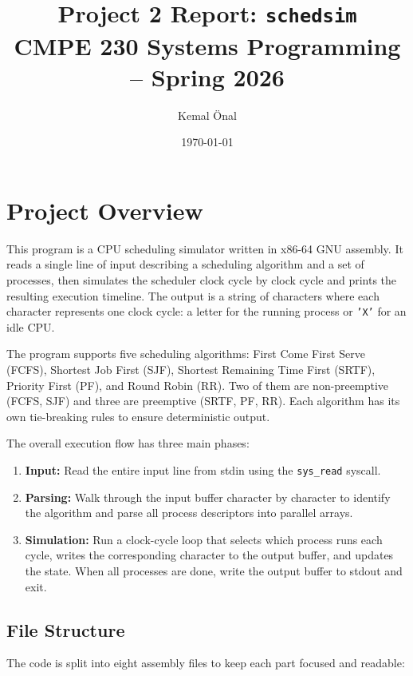 \documentclass[a4paper,12pt]{article}
\title{Project 2 Report: \texttt{schedsim}\\
\large CMPE 230 Systems Programming -- Spring 2026}
\author{
Kemal Önal 
}
\date{\today}
\begin{document}
\maketitle

\section{Project Overview}

This program is a CPU scheduling simulator written in x86-64 GNU assembly. It reads a single line of input describing a scheduling algorithm and a set of processes, then simulates the scheduler clock cycle by clock cycle and prints the resulting execution timeline. The output is a string of characters where each character represents one clock cycle: a letter for the running process or \texttt{'X'} for an idle CPU.

The program supports five scheduling algorithms: First Come First Serve (FCFS), Shortest Job First (SJF), Shortest Remaining Time First (SRTF), Priority First (PF), and Round Robin (RR). Two of them are non-preemptive (FCFS, SJF) and three are preemptive (SRTF, PF, RR). Each algorithm has its own tie-breaking rules to ensure deterministic output.

The overall execution flow has three main phases:
\begin{enumerate}
    \item \textbf{Input:} Read the entire input line from stdin using the \texttt{sys\_read} syscall.
    \item \textbf{Parsing:} Walk through the input buffer character by character to identify the algorithm and parse all process descriptors into parallel arrays.
    \item \textbf{Simulation:} Run a clock-cycle loop that selects which process runs each cycle, writes the corresponding character to the output buffer, and updates the state. When all processes are done, write the output buffer to stdout and exit.
\end{enumerate}

\subsection{File Structure}

The code is split into eight assembly files to keep each part focused and readable:
\end{document}
